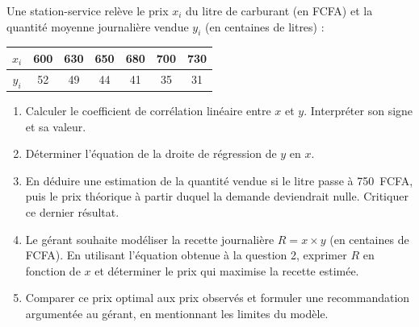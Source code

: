 \documentclass[11pt]{article}
\begin{document}
\begin{exercice}
Une station-service relève le prix $x_i$ du litre de carburant (en FCFA) et la quantité moyenne journalière vendue $y_i$ (en centaines de litres) :

\begin{center}
\begin{tabular}{|c|c|c|c|c|c|c|}
\hline
$x_i$ & 600 & 630 & 650 & 680 & 700 & 730 \\
\hline
$y_i$ & 52 & 49 & 44 & 41 & 35 & 31 \\
\hline
\end{tabular}
\end{center}

\begin{enumerate}
\item Calculer le coefficient de corrélation linéaire entre $x$ et $y$. Interpréter son signe et sa valeur.
\item Déterminer l'équation de la droite de régression de $y$ en $x$.
\item En déduire une estimation de la quantité vendue si le litre passe à \SI{750}{FCFA}, puis le prix théorique à partir duquel la demande deviendrait nulle. Critiquer ce dernier résultat.
\item Le gérant souhaite modéliser la recette journalière $R = x \times y$ (en centaines de FCFA). En utilisant l'équation obtenue à la question 2, exprimer $R$ en fonction de $x$ et déterminer le prix qui maximise la recette estimée.
\item Comparer ce prix optimal aux prix observés et formuler une recommandation argumentée au gérant, en mentionnant les limites du modèle.
\end{enumerate}
\end{exercice}
\end{document}
